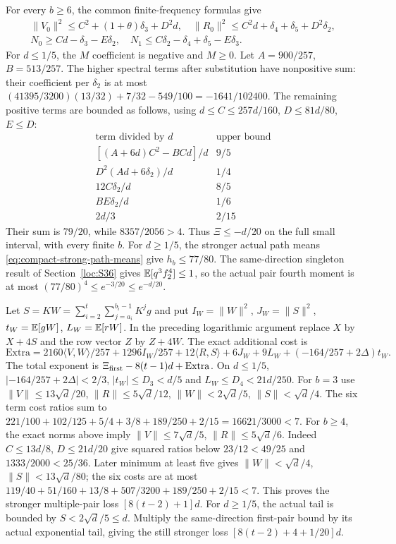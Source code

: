 For every $b\ge6$, the common finite-frequency formulas give
\begin{gather*}
 \|V_0\|^2\le C^2+(1+\theta)\delta_{3}+D^2d,\quad
 \|R_0\|^2\le C^2d+\delta_{4}+\delta_{5}+D^2\delta_{2},\\
 N_0\ge Cd-\delta_{3}-E\delta_{2},\quad
 N_1\le C\delta_{2}-\delta_{4}+\delta_{5}-E\delta_{3}.
\end{gather*}
For $d\le1/5$, the $M$ coefficient is negative and $M\ge0$.
Let $A=900/257$, $B=513/257$.
The higher spectral terms after substitution have nonpositive sum:
their coefficient per $\delta_{2}$ is at most
$(41395/3200)(13/32)+7/32-549/100=-1641/102400$.
The remaining positive terms are bounded as follows, using
$d\le C\le257d/160$, $D\le81d/80$, $E\le D$:
\[
\begin{array}{c|c}
\text{term divided by }d&\text{upper bound}\\\hline
[(A+6d)C^2-BCd]/d&9/5\\
D^2(Ad+6\delta_{2})/d&1/4\\
12C\delta_{2}/d&8/5\\
BE\delta_{2}/d&1/6\\
2d/3&2/15
\end{array}
\]
Their sum is $79/20$, while $8357/2056>4$.
Thus $\Xi\le-d/20$ on the full small interval, with every finite $b$.
For $d\ge1/5$, the stronger actual path means
\eqref{eq:compact-strong-path-means} give $h_b\le77/80$.
The same-direction singleton result of Section~\ref{loc:S36} gives
$\mathbb E[q^3f_2^4]\le1$, so the actual pair fourth moment is at most
$(77/80)^4\le e^{-3/20}\le e^{-d/20}$.

Let $S=KW=\sum_{i=2}^t\sum_{j=a_i}^{b_i-1}K^jg$ and put
$I_W=\|W\|^2$, $J_W=\|S\|^2$,
$t_W=\mathbb E[gW]$, $L_W=\mathbb E[rW]$.
In the preceding logarithmic argument replace $X$ by $X+4S$ and
the row vector $Z$ by $Z+4W$.
The exact additional cost is
\[
 \mathrm{Extra}=2160\langle V,W\rangle/257+1296I_W/257
 +12\langle R,S\rangle+6J_W+9L_W+(-164/257+2\Delta)t_W.
\]
The total exponent is $\Xi_{\rm first}-8(t-1)d+\mathrm{Extra}$.
On $d\le1/5$, $|-164/257+2\Delta|<2/3$,
$|t_W|\le D_3<d/5$ and $L_W\le D_4<21d/250$.
For $b=3$ use
$\|V\|\le13\sqrt d/20$, $\|R\|\le5\sqrt d/12$,
$\|W\|<2\sqrt d/5$, $\|S\|<\sqrt d/4$.
The six term cost ratios sum to
$221/100+102/125+5/4+3/8+189/250+2/15=16621/3000<7$.
For $b\ge4$, the exact norms above imply
$\|V\|\le7\sqrt d/5$, $\|R\|\le5\sqrt d/6$.
Indeed $C\le13d/8$, $D\le21d/20$ give squared ratios below
$23/12<49/25$ and $1333/2000<25/36$.
Later minimum at least five gives
$\|W\|<\sqrt d/4$, $\|S\|<13\sqrt d/80$;
the six costs are at most
$119/40+51/160+13/8+507/3200+189/250+2/15<7$.
This proves the stronger multiple-pair loss $[8(t-2)+1]d$.
For $d\ge1/5$, the actual tail is bounded by $S<2\sqrt d/5\le d$.
Multiply the same-direction first-pair bound by its actual exponential
tail, giving the still stronger loss $[8(t-2)+4+1/20]d$.

